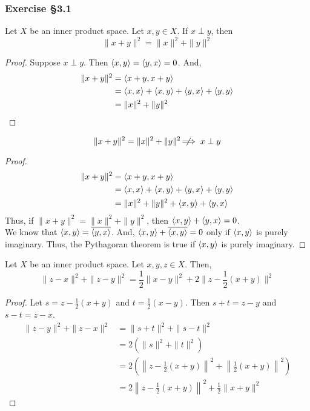 \subsubsection{Exercise \S3.1}
\begin{theorem}
	Let $X$ be an inner product space.
	Let $x,y \in X$.
	If $x \perp y$, then
	\[ \|x+y\|^2 = \|x\|^2 + \|y\|^2 \]
\end{theorem}
\begin{proof}
	Suppose $x \perp y$.
	Then $\left\langle x,y \right\rangle = \left\langle y,x \right\rangle = 0$.
	And,
	\begin{align*}
		\|x+y\|^2 
		& = \left\langle x+y,x+y \right\rangle \\
		& = \left\langle x,x \right\rangle + \left\langle x,y \right\rangle + \left\langle y,x \right\rangle + \left\langle y,y \right\rangle \\
		&  = \|x\|^2 + \|y\|^2
	\end{align*}
\end{proof}

\begin{remark}
	\[ \|x+y\|^2 = \|x\|^2 + \|y\|^2 \;\not\nobreak\!\!\!\!\implies x \perp y \]
\end{remark}
\begin{proof}
	\begin{align*}
		\|x+y\|^2 
		& = \left\langle x+y,x+y \right\rangle \\
		& = \left\langle x,x \right\rangle + \left\langle x,y \right\rangle + \left\langle y,x \right\rangle + \left\langle y,y \right\rangle \\
		& = \|x\|^2 + \|y\|^2 + \left\langle x,y \right\rangle + \left\langle y,x \right\rangle
	\end{align*}
	Thus, if $\|x+y\|^2 = \|x\|^2 + \|y\|^2$, then $\left\langle x,y \right\rangle + \left\langle y,x \right\rangle = 0$.\\

	We know that $\left\langle x,y \right\rangle = \overline{\left\langle y,x \right\rangle}$.
	And, $\left\langle x,y \right\rangle + \overline{\left\langle x,y \right\rangle} = 0$ only if $\left\langle x,y \right\rangle$ is purely imaginary.
	Thus, the Pythagoran theorem is true if $\left\langle x,y \right\rangle$ is purely imaginary.
\end{proof}

\begin{theorem}
	Let $X$ be an inner product space.
	Let $x,y,z \in X$.
	Then,
	\[ \|z-x\|^2 + \|z-y\|^2 = \frac{1}{2} \|x-y\|^2 + 2\|z - \frac{1}{2}(x+y)\|^2 \]
\end{theorem}
\begin{proof}
	Let $s = z-\frac{1}{2}(x+y)$ and $t = \frac{1}{2}(x-y)$.
	Then $s+t = z-y$ and $s-t = z-x$.
	\begin{align*}
		\|z-y\|^2 + \|z-x\|^2 
		& = \|s+t\|^2 + \|s-t\|^2  \\
		& = 2(\|s\|^2 + \|t\|^2) \\
		& = 2\left(\left\|z-\frac{1}{2}(x+y)\right\|^2 + \left\|\frac{1}{2}(x+y)\right\|^2\right) \\
		& = 2\left\|z-\frac{1}{2}(x+y)\right\|^2 + \frac{1}{2} \|x+y\|^2
	\end{align*}
\end{proof}

